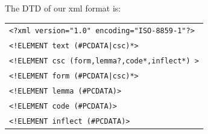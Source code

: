 The DTD of our xml format is:

\begin{tabular}{l}
\texttt{<?xml version="1.0" encoding="ISO-8859-1"?>}\\
\texttt{<!ELEMENT text (\#PCDATA|csc)*>}\\
\texttt{<!ELEMENT csc (form,lemma?,code*,inflect*) >}\\
\texttt{<!ELEMENT form (\#PCDATA|csc)*>}\\
\texttt{<!ELEMENT lemma (\#PCDATA)>}\\
\texttt{<!ELEMENT code (\#PCDATA)>}\\
\texttt{<!ELEMENT inflect (\#PCDATA)>}\\
\end{tabular}


